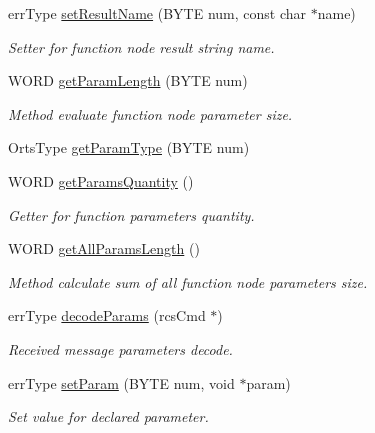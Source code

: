 \begin{DoxyCompactItemize}
errType \hyperlink{classfunctionNode_a228b06e16a59f06a081db9d047a38a06}{setResultName} (BYTE num, const char $\ast$name)
\begin{DoxyCompactList}\small\item\em Setter for function node result string name. \item\end{DoxyCompactList}\item 
WORD \hyperlink{classfunctionNode_a02eb9112a65ef639ac2809020a7017ce}{getParamLength} (BYTE num)
\begin{DoxyCompactList}\small\item\em Method evaluate function node parameter size. \item\end{DoxyCompactList}\item 
OrtsType \hyperlink{classfunctionNode_a282c447ec3aaf343432d255beb8c39bc}{getParamType} (BYTE num)
\item 
WORD \hyperlink{classfunctionNode_a03d4f0204dcac9ae9cf4bffa046b15de}{getParamsQuantity} ()
\begin{DoxyCompactList}\small\item\em Getter for function parameters quantity. \item\end{DoxyCompactList}\item 
WORD \hyperlink{classfunctionNode_a78a11e3eac124ed30ebc8b69c32a2ec2}{getAllParamsLength} ()
\begin{DoxyCompactList}\small\item\em Method calculate sum of all function node parameters size. \item\end{DoxyCompactList}\item 
errType \hyperlink{classfunctionNode_a27cbea98243ac58f288f28cfc3f6ea32}{decodeParams} (rcsCmd $\ast$)
\begin{DoxyCompactList}\small\item\em Received message parameters decode. \item\end{DoxyCompactList}\item 
errType \hyperlink{classfunctionNode_a9bb767cf6e5519091a7a05785474c418}{setParam} (BYTE num, void $\ast$param)
\begin{DoxyCompactList}\small\item\em Set value for declared parameter. \item\end{DoxyCompactList}\item 

\end{DoxyCompactItemize}
